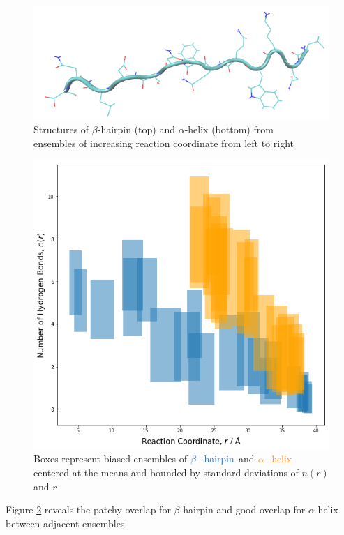 \documentclass{article}[12pt]
\numberwithin{equation}{section}
\begin{document}
\begin{figure}[H]
	\includegraphics[scale=0.35]{helix-3}
\caption{Structures of $\beta$-hairpin (top) and $\alpha$-helix (bottom)
from\\ ensembles of increasing reaction coordinate from left to right}
\label{fig:unfold}
\end{figure}
\begin{figure}[H]
	\centering{}
	\captionsetup{justification=centering}
	\includegraphics[scale=0.5]{hydrogen}
\caption{Boxes represent biased ensembles of $\color{NavyBlue}{\beta\mathrm{-hairpin}}$ and
$\color{orange}{\alpha\mathrm{-helix}}$\\centered at the means and bounded by standard
deviations of $n(r)$ and $r$}
\label{fig:hydrogen}
\end{figure}
\pagebreak
Figure \ref{fig:hydrogen} reveals the patchy overlap for $\beta$-hairpin and
good overlap for $\alpha$-helix between adjacent ensembles
\end{document}
